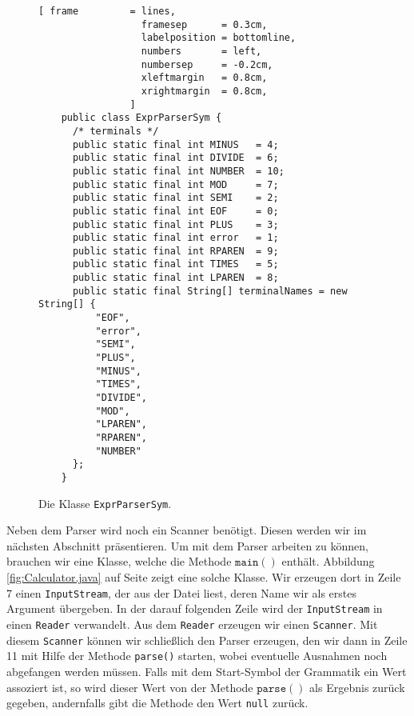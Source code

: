 \begin{figure}[!ht]
\centering
\begin{Verbatim}[ frame         = lines, 
                  framesep      = 0.3cm, 
                  labelposition = bottomline,
                  numbers       = left,
                  numbersep     = -0.2cm,
                  xleftmargin   = 0.8cm,
                  xrightmargin  = 0.8cm,
                ]
    public class ExprParserSym {
      /* terminals */
      public static final int MINUS   = 4;
      public static final int DIVIDE  = 6;
      public static final int NUMBER  = 10;
      public static final int MOD     = 7;
      public static final int SEMI    = 2;
      public static final int EOF     = 0;
      public static final int PLUS    = 3;
      public static final int error   = 1;
      public static final int RPAREN  = 9;
      public static final int TIMES   = 5;
      public static final int LPAREN  = 8;
      public static final String[] terminalNames = new String[] {
          "EOF",
          "error",
          "SEMI",
          "PLUS",
          "MINUS",
          "TIMES",
          "DIVIDE",
          "MOD",
          "LPAREN",
          "RPAREN",
          "NUMBER"
      };
    }
\end{Verbatim}
\vspace*{-0.3cm}
\caption{Die Klasse \texttt{ExprParserSym}.}
\label{fig:sym.java}
\end{figure}

\noindent
Neben dem Parser wird noch ein Scanner ben\"otigt.  Diesen werden wir im n\"achsten Abschnitt pr\"asentieren.
Um mit dem Parser arbeiten zu k\"onnen, brauchen wir eine Klasse, welche die Methode
$\texttt{main}()$ enth\"alt.  Abbildung \ref{fig:Calculator.java} auf Seite
\pageref{fig:Calculator.java} zeigt eine solche Klasse.  Wir
erzeugen dort in Zeile 7 einen \texttt{InputStream}, der aus der Datei liest, deren Name wir als
erstes Argument \"ubergeben.   In der darauf folgenden Zeile wird der \texttt{InputStream} in einen
\texttt{Reader} verwandelt.  Aus dem \texttt{Reader} erzeugen wir einen \texttt{Scanner}.  Mit
diesem \texttt{Scanner} k\"onnen wir schlie{\ss}lich den Parser erzeugen, den wir dann in Zeile 11 mit
Hilfe der Methode \texttt{parse()} starten, wobei eventuelle Ausnahmen noch abgefangen werden m\"ussen.
Falls mit dem Start-Symbol der Grammatik ein Wert assoziert ist, so wird dieser Wert von
der Methode $\texttt{parse}()$ als Ergebnis zur\"uck gegeben, andernfalls gibt die Methode den Wert
\texttt{null} zur\"uck.


